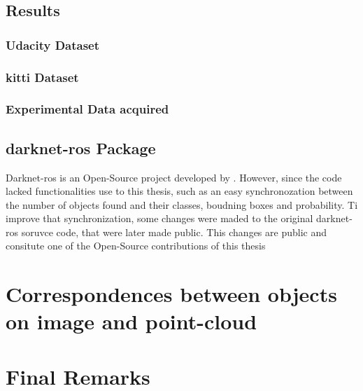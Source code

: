 \subsection{Results}

\subsubsection{Udacity Dataset}

\subsubsection{\ac{kitti} Dataset}

\subsubsection{Experimental Data acquired}

\subsection{darknet-ros Package}
Darknet-ros is an Open-Source project developed by . However, since the code lacked  functionalities use to this thesis, such as an easy synchronozation between the number of objects found and their classes, boudning boxes and probability. Ti improve that synchronization, some changes were maded to the original darknet-ros soruvce code, that were later made public. This changes are public and consitute one of the Open-Source contributions of this thesis


\section{Correspondences between objects on image and point-cloud}

\section{Final Remarks}
